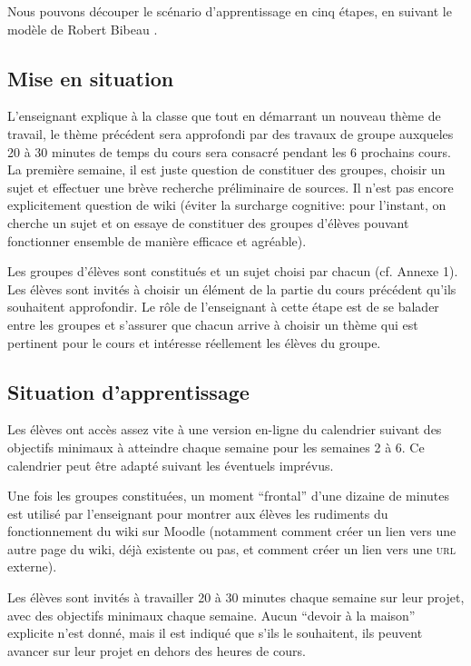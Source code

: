 \documentclass[11pt,bibliography=totoc]{scrartcl}
\begin{document}
Nous pouvons découper le scénario d'apprentissage en cinq étapes, en suivant le
modèle de Robert Bibeau \autocite{bibeau}.

\subsection{Mise en situation}
L'enseignant explique à la classe que tout en démarrant un nouveau thème de
travail, le thème précédent sera approfondi par des travaux de groupe auxqueles
20 à 30 minutes de temps du cours sera consacré pendant les 6 prochains cours.
La première semaine, il est juste question de constituer des groupes, choisir un
sujet et effectuer une brève recherche préliminaire de sources. Il n'est pas
encore explicitement question de wiki (éviter la surcharge cognitive: pour
l'instant, on cherche un sujet et on essaye de constituer des groupes d'élèves
pouvant fonctionner ensemble de manière efficace et agréable).

Les groupes d'élèves sont constitués et un sujet choisi par chacun (cf. Annexe
1). Les élèves sont invités à choisir un élément de la partie du cours précédent
qu'ils souhaitent approfondir. Le rôle de l'enseignant à cette étape est de se
balader entre les groupes et s'assurer que chacun arrive à choisir un thème qui
est pertinent pour le cours et intéresse réellement les élèves du groupe.

\subsection{Situation d'apprentissage}
Les élèves ont accès assez vite à une version en-ligne du calendrier suivant des
objectifs minimaux à atteindre chaque semaine pour les semaines 2 à 6. Ce
calendrier peut être adapté suivant les éventuels imprévus.

Une fois les groupes constituées, un moment ``frontal'' d'une dizaine de minutes
est utilisé par l'enseignant pour montrer aux élèves les rudiments du
fonctionnement du wiki sur Moodle (notamment comment créer un lien vers une
autre page du wiki, déjà existente ou pas, et comment créer un lien vers une
\textsc{url} externe).

Les élèves sont invités à travailler 20 à 30 minutes chaque semaine sur leur
projet, avec des objectifs minimaux chaque semaine. Aucun ``devoir à la maison''
explicite n'est donné, mais il est indiqué que s'ils le souhaitent, ils peuvent
avancer sur leur projet en dehors des heures de cours.
\end{document}
